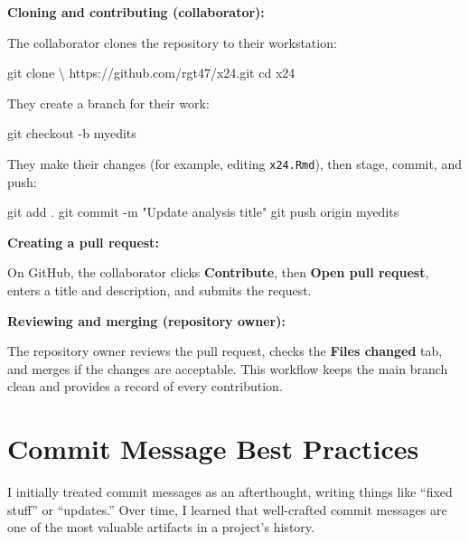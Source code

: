 \documentclass[
  letterpaper,
  DIV=11,
  numbers=noendperiod]{scrartcl}
\newenvironment{Shaded}{\begin{snugshade}}{\end{snugshade}}
\newcommand{\AttributeTok}[1]{\textcolor[rgb]{0.40,0.45,0.13}{#1}}
\newcommand{\BuiltInTok}[1]{\textcolor[rgb]{0.00,0.23,0.31}{#1}}
\newcommand{\DataTypeTok}[1]{\textcolor[rgb]{0.68,0.00,0.00}{#1}}
\newcommand{\FunctionTok}[1]{\textcolor[rgb]{0.28,0.35,0.67}{#1}}
\newcommand{\NormalTok}[1]{\textcolor[rgb]{0.00,0.23,0.31}{#1}}
\newcommand{\StringTok}[1]{\textcolor[rgb]{0.13,0.47,0.30}{#1}}
\begin{document}
\textbf{Cloning and contributing (collaborator):}

The collaborator clones the repository to their workstation:

\begin{Shaded}
\begin{Highlighting}[]
\FunctionTok{git}\NormalTok{ clone }\DataTypeTok{\textbackslash{}}
\NormalTok{  https://github.com/rgt47/x24.git}
\BuiltInTok{cd}\NormalTok{ x24}
\end{Highlighting}
\end{Shaded}

They create a branch for their work:

\begin{Shaded}
\begin{Highlighting}[]
\FunctionTok{git}\NormalTok{ checkout }\AttributeTok{{-}b}\NormalTok{ myedits}
\end{Highlighting}
\end{Shaded}

They make their changes (for example, editing \texttt{x24.Rmd}), then
stage, commit, and push:

\begin{Shaded}
\begin{Highlighting}[]
\FunctionTok{git}\NormalTok{ add .}
\FunctionTok{git}\NormalTok{ commit }\AttributeTok{{-}m} \StringTok{"Update analysis title"}
\FunctionTok{git}\NormalTok{ push origin myedits}
\end{Highlighting}
\end{Shaded}

\textbf{Creating a pull request:}

On GitHub, the collaborator clicks \textbf{Contribute}, then
\textbf{Open pull request}, enters a title and description, and submits
the request.

\textbf{Reviewing and merging (repository owner):}

The repository owner reviews the pull request, checks the \textbf{Files
changed} tab, and merges if the changes are acceptable. This workflow
keeps the main branch clean and provides a record of every contribution.

\section{Commit Message Best
Practices}\label{commit-message-best-practices}

I initially treated commit messages as an afterthought, writing things
like ``fixed stuff'' or ``updates.'' Over time, I learned that
well-crafted commit messages are one of the most valuable artifacts in a
project's history.
\end{document}
